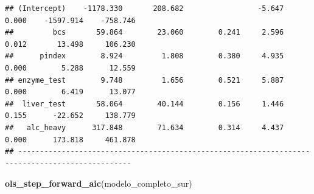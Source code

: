 \documentclass[
]{book}
\newenvironment{Shaded}{\begin{snugshade}}{\end{snugshade}}
\newcommand{\FunctionTok}[1]{\textcolor[rgb]{0.13,0.29,0.53}{\textbf{#1}}}
\newcommand{\NormalTok}[1]{#1}
\begin{document}
\begin{verbatim}
## (Intercept)    -1178.330       208.682                 -5.647    0.000    -1597.914    -758.746 
##         bcs       59.864        23.060        0.241     2.596    0.012       13.498     106.230 
##      pindex        8.924         1.808        0.380     4.935    0.000        5.288      12.559 
## enzyme_test        9.748         1.656        0.521     5.887    0.000        6.419      13.077 
##  liver_test       58.064        40.144        0.156     1.446    0.155      -22.652     138.779 
##   alc_heavy      317.848        71.634        0.314     4.437    0.000      173.818     461.878 
## ------------------------------------------------------------------------------------------------
\end{verbatim}

\begin{Shaded}
\begin{Highlighting}[]
\FunctionTok{ols\_step\_forward\_aic}\NormalTok{(modelo\_completo\_sur)}
\end{Highlighting}
\end{Shaded}
\end{document}
